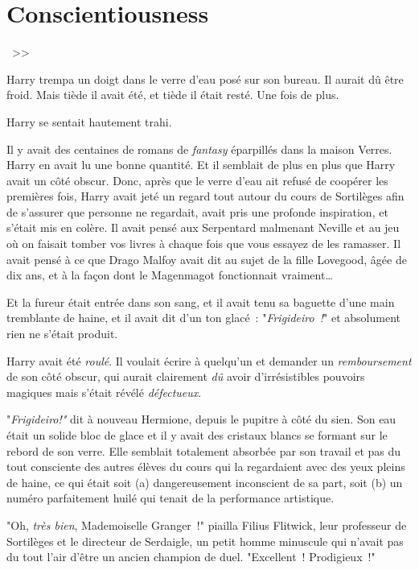 \chapter{Conscientiousness}

~>>

\hplettrineextrapara
Harry trempa un doigt dans le verre d'eau posé sur son bureau. Il aurait dû être froid. Mais tiède il avait été, et tiède il était resté. Une fois de plus.

Harry se sentait hautement trahi.

Il y avait des centaines de romans de \emph{fantasy} éparpillés dans la maison Verres. Harry en avait lu une bonne quantité. Et il semblait de plus en plus que Harry avait un côté obscur. Donc, après que le verre d'eau ait refusé de coopérer les premières fois, Harry avait jeté un regard tout autour du cours de Sortilèges afin de s'assurer que personne ne regardait, avait pris une profonde inspiration, et s'était mis en colère. Il avait pensé aux Serpentard malmenant Neville et au jeu où on faisait tomber vos livres à chaque fois que vous essayez de les ramasser. Il avait pensé à ce que Drago Malfoy avait dit au sujet de la fille Lovegood, âgée de dix ans, et à la façon dont le Magenmagot fonctionnait vraiment…

Et la fureur était entrée dans son sang, et il avait tenu sa baguette d'une main tremblante de haine, et il avait dit d'un ton glacé~: "\emph{Frigideiro~!}" et absolument rien ne s'était produit.

Harry avait été \emph{roulé}. Il voulait écrire à quelqu'un et demander un \emph{remboursement} de son côté obscur, qui aurait clairement \emph{dû} avoir d'irrésistibles pouvoirs magiques mais s'était révélé \emph{défectueux}.

"\emph{Frigideiro!"} dit à nouveau Hermione, depuis le pupitre à côté du sien. Son eau était un solide bloc de glace et il y avait des cristaux blancs se formant sur le rebord de son verre. Elle semblait totalement absorbée par son travail et pas du tout consciente des autres élèves du cours qui la regardaient avec des yeux pleins de haine, ce qui était soit (a) dangereusement inconscient de sa part, soit (b) un numéro parfaitement huilé qui tenait de la performance artistique.

"Oh, \emph{très bien}, Mademoiselle Granger~!" piailla Filius Flitwick, leur professeur de Sortilèges et le directeur de Serdaigle, un petit homme minuscule qui n'avait pas du tout l'air d'être un ancien champion de duel. "Excellent~! Prodigieux~!"

